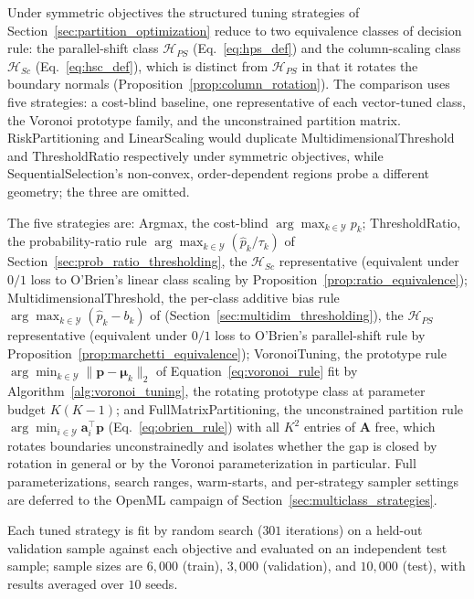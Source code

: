 Under symmetric objectives the structured tuning strategies of Section~\ref{sec:partition_optimization} reduce to two equivalence classes of decision rule: the parallel-shift class $\mathcal{H}_{PS}$ (Eq.~\ref{eq:hps_def}) and the column-scaling class $\mathcal{H}_{Sc}$ (Eq.~\ref{eq:hsc_def}), which is distinct from $\mathcal{H}_{PS}$ in that it rotates the boundary normals (Proposition~\ref{prop:column_rotation}). The comparison uses five strategies: a cost-blind baseline, one representative of each vector-tuned class, the Voronoi prototype family, and the unconstrained partition matrix. RiskPartitioning and LinearScaling would duplicate MultidimensionalThreshold and ThresholdRatio respectively under symmetric objectives, while SequentialSelection's non-convex, order-dependent regions probe a different geometry; the three are omitted.

The five strategies are: Argmax, the cost-blind $\arg\max_{k \in \mathcal{Y}} p_k$; ThresholdRatio, the probability-ratio rule $\arg\max_{k \in \mathcal{Y}} (\hat{p}_k / \tau_k)$ of Section~\ref{sec:prob_ratio_thresholding}, the $\mathcal{H}_{Sc}$ representative (equivalent under $0/1$ loss to O'Brien's linear class scaling by Proposition~\ref{prop:ratio_equivalence}); MultidimensionalThreshold, the per-class additive bias rule $\arg\max_{k \in \mathcal{Y}} (\hat{p}_k - b_k)$ of \citet{legnaro2025multiclass} (Section~\ref{sec:multidim_thresholding}), the $\mathcal{H}_{PS}$ representative (equivalent under $0/1$ loss to O'Brien's parallel-shift rule by Proposition~\ref{prop:marchetti_equivalence}); VoronoiTuning, the prototype rule $\arg\min_{k \in \mathcal{Y}} \|\mathbf{p} - \boldsymbol{\mu}_k\|_2$ of Equation~\eqref{eq:voronoi_rule} fit by Algorithm~\ref{alg:voronoi_tuning}, the rotating prototype class at parameter budget $K(K-1)$; and FullMatrixPartitioning, the unconstrained partition rule $\arg\min_{i \in \mathcal{Y}} \mathbf{a}_i^\top \mathbf{p}$ (Eq.~\ref{eq:obrien_rule}) with all $K^2$ entries of $\mathbf{A}$ free, which rotates boundaries unconstrainedly and isolates whether the gap is closed by rotation in general or by the Voronoi parameterization in particular. Full parameterizations, search ranges, warm-starts, and per-strategy sampler settings are deferred to the OpenML campaign of Section~\ref{sec:multiclass_strategies}.

Each tuned strategy is fit by random search ($301$ iterations) on a held-out validation sample against each objective and evaluated on an independent test sample; sample sizes are $6{,}000$ (train), $3{,}000$ (validation), and $10{,}000$ (test), with results averaged over $10$ seeds.

